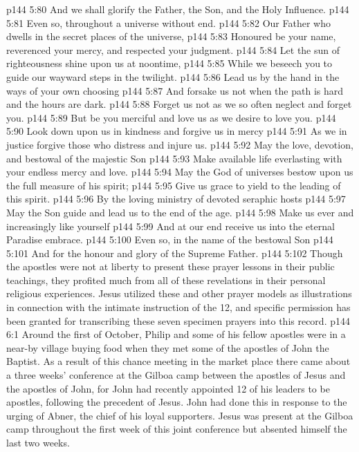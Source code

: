 \vs p144 5:80 \hsetoff And we shall glorify the Father, the Son, and the Holy Influence.
\vs p144 5:81 Even so, throughout a universe without end.
\separatorshort
\vs p144 5:82 Our Father who dwells in the secret places of the universe,
\vs p144 5:83 \hsetoff Honoured be your name, reverenced your mercy, and respected your judgment.
\vs p144 5:84 Let the sun of righteousness shine upon us at noontime,
\vs p144 5:85 \hsetoff While we beseech you to guide our wayward steps in the twilight.
\vs p144 5:86 Lead us by the hand in the ways of your own choosing
\vs p144 5:87 \hsetoff And forsake us not when the path is hard and the hours are dark.
\vs p144 5:88 Forget us not as we so often neglect and forget you.
\vs p144 5:89 \hsetoff But be you merciful and love us as we desire to love you.
\vs p144 5:90 Look down upon us in kindness and forgive us in mercy
\vs p144 5:91 \hsetoff As we in justice forgive those who distress and injure us.
\vs p144 5:92 May the love, devotion, and bestowal of the majestic Son
\vs p144 5:93 \hsetoff Make available life everlasting with your endless mercy and love.
\vs p144 5:94 May the God of universes bestow upon us the full measure of his spirit;
\vs p144 5:95 \hsetoff Give us grace to yield to the leading of this spirit.
\vs p144 5:96 By the loving ministry of devoted seraphic hosts
\vs p144 5:97 \hsetoff May the Son guide and lead us to the end of the age.
\vs p144 5:98 Make us ever and increasingly like yourself
\vs p144 5:99 \hsetoff And at our end receive us into the eternal Paradise embrace.
\vs p144 5:100 Even so, in the name of the bestowal Son
\vs p144 5:101 \hsetoff And for the honour and glory of the Supreme Father.
\vsetoff
\vs p144 5:102 Though the apostles were not at liberty to present these prayer lessons in their public teachings, they profited much from all of these revelations in their personal religious experiences. Jesus utilized these and other prayer models as illustrations in connection with the intimate instruction of the 12, and specific permission has been granted for transcribing these seven specimen prayers into this record.
\vs p144 6:1 Around the first of October, Philip and some of his fellow apostles were in a near\hyp{}by village buying food when they met some of the apostles of John the Baptist. As a result of this chance meeting in the market place there came about a three weeks’ conference at the Gilboa camp between the apostles of Jesus and the apostles of John, for John had recently appointed 12 of his leaders to be apostles, following the precedent of Jesus. John had done this in response to the urging of Abner, the chief of his loyal supporters. Jesus was present at the Gilboa camp throughout the first week of this joint conference but absented himself the last two weeks.
